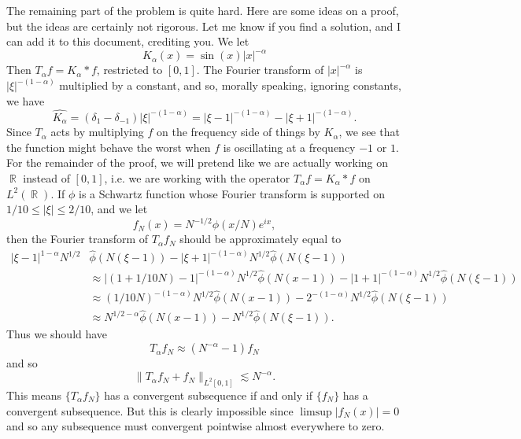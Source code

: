 \documentclass[answers]{exam}
\DeclareMathOperator{\RR}{\mathbb{R}}
\theoremstyle{problemstyle}
\newcommand{\1}[1]{\textbf{1}_{\left[#1\right]}} %
\begin{document}
\begin{questions}
\begin{parts}
\begin{solution}
    	The remaining part of the problem is quite hard. Here are some ideas on a proof, but the ideas are certainly not rigorous. Let me know if you find a solution, and I can add it to this document, crediting you. We let
    	\[ K_\alpha(x) = \sin(x) |x|^{-\alpha} \]
    	Then $T_\alpha f = K_\alpha * f$, restricted to $[0,1]$. The Fourier transform of $|x|^{-\alpha}$ is $|\xi|^{-(1 - \alpha)}$ multiplied by a constant, and so, morally speaking, ignoring constants, we have
    	\[ \widehat{K_\alpha} = (\delta_1 - \delta_{-1}) |\xi|^{-(1 - \alpha)} = |\xi - 1|^{-(1 - \alpha)} - |\xi + 1|^{-(1 - \alpha)}. \]
    	Since $T_\alpha$ acts by multiplying $f$ on the frequency side of things by $\widehat{K_\alpha}$, we see that the function might behave the worst when $f$ is oscillating at a frequency $-1$ or $1$. For the remainder of the proof, we will pretend like we are actually working on $\RR$ instead of $[0,1]$, i.e. we are working with the operator $T_\alpha f = K_\alpha * f$ on $L^2(\RR)$. If $\phi$ is a Schwartz function whose Fourier transform is supported on $1/10 \leq |\xi| \leq 2/10$, and we let
    	\[ f_N(x) = N^{-1/2} \phi(x/N) e^{ix}, \]
    	then the Fourier transform of $T_\alpha f_N$ should be approximately equal to
    	\begin{align*}
    		|\xi - 1|^{1 - \alpha} N^{1/2} & \widehat{\phi}(N(\xi - 1)) - |\xi + 1|^{-(1 - \alpha)} N^{1/2} \widehat{\phi}(N(\xi-1))\\
    		&\approx |(1 + 1/10 N) - 1|^{-(1 - \alpha)} N^{1/2} \widehat{\phi}(N(x - 1)) - |1 + 1|^{-(1 - \alpha)} N^{1/2} \widehat{\phi}(N(\xi - 1))\\
    		&\approx (1/10N)^{-(1 - \alpha)} N^{1/2} \widehat{\phi}(N(x - 1)) - 2^{-(1 - \alpha)} N^{1/2} \widehat{\phi}(N(\xi - 1))\\
    		&\approx N^{1/2 - \alpha} \widehat{\phi}(N(x - 1)) - N^{1/2} \widehat{\phi}(N(\xi - 1)).
    	\end{align*}
    	Thus we should have
    	\[ T_\alpha f_N \approx (N^{-\alpha} - 1) f_N \]
    	and so
    	\[ \| T_\alpha f_N + f_N \|_{L^2[0,1]} \lesssim N^{-\alpha}. \]
    	This means $\{ T_\alpha f_N \}$ has a convergent subsequence if and only if $\{ f_N \}$ has a convergent subsequence. But this is clearly impossible since $\limsup |f_N(x)| = 0$ and so any subsequence must convergent pointwise almost everywhere to zero.

    	\begin{comment}


\end{comment}
\end{solution}
\end{parts}
\end{questions}
\end{document}
